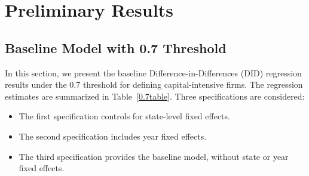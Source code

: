 \documentclass[11pt]{article}
\begin{document}
\section{Preliminary Results}
\subsection{Baseline Model with 0.7 Threshold}

In this section, we present the baseline Difference-in-Differences (DID) regression results under the 0.7 threshold for defining capital-intensive firms. The regression estimates are summarized in Table~\ref{0.7table}. Three specifications are considered:
\begin{itemize}
    \item The first specification controls for state-level fixed effects.
    \item The second specification includes year fixed effects.
    \item The third specification provides the baseline model, without state or year fixed effects.
\end{itemize}
\end{document}
